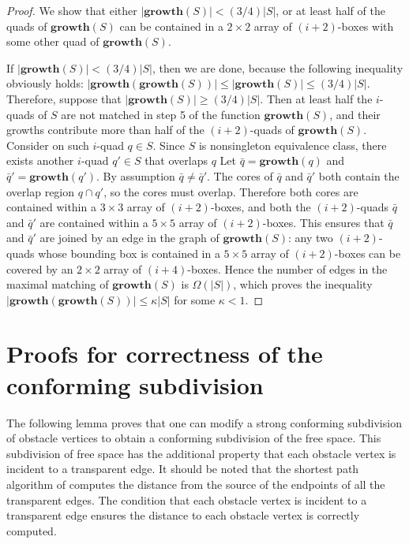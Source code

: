 \begin{proof}
We show that either $|\mathbf{growth}(S)| < (3/4)|S|$, or at least half of the quads of $\mathbf{growth}(S)$ can be contained in a $2 \times 2$ array of $(i+2)$-boxes with some other quad of $\mathbf{growth}(S)$. 

If $|\mathbf{growth}(S)| < (3/4)|S|$, then we are done, because the following inequality obviously holds: $|\mathbf{growth}(\mathbf{growth}(S))| \leq |\mathbf{growth}(S)| \leq (3/4)|S|$. Therefore, suppose that $|\mathbf{growth}(S)| \geq (3/4)|S|$. Then at least half the $i$-quads of $S$ are not matched in step 5 of the function $\mathbf{growth}(S)$, and their growths contribute more than half of the $(i+2)$-quads of $\mathbf{growth}(S)$. Consider on such $i$-quad $q\in S$. Since $S$ is nonsingleton equivalence class, there exists another $i$-quad $q'\in S$ that overlaps $q$ Let $\bar{q}=\mathbf{growth}(q)$ and $\bar{q}' = \mathbf{growth}(q')$. By assumption $\bar{q} \neq \bar{q}'$. The cores of $\bar{q}$ and $\bar{q}'$ both contain the overlap region $q\cap q'$, so the cores must overlap. Therefore both cores are contained within a $3 \times 3$ array of $(i+2)$-boxes, and both the $(i+2)$-quads $\bar{q}$ and $\bar{q}'$ are contained within a $5 \times 5$ array of $(i+2)$-boxes. This ensures that $\bar{q}$ and $\bar{q}'$ are joined by an edge in the graph of $\mathbf{growth}(S)$: any two $(i+2)$-quads whose bounding box is contained in a $5 \times 5$ array of $(i+2)$-boxes can be covered by an $2 \times 2$ array of $(i+4)$-boxes. Hence the number of edges in the maximal matching of $\mathbf{growth}(S)$ is $\Omega(|S|)$, which proves the inequality $|\mathbf{growth}(\mathbf{growth}(S))| \leq \kappa|S|$ for some $\kappa < 1$.
\end{proof}

\section{Proofs for correctness of the conforming subdivision}

The following lemma proves that one can modify a strong conforming subdivision of 
obstacle vertices to obtain a conforming subdivision of the free space. This 
subdivision of free space has the additional property that each obstacle vertex is 
incident to a transparent edge. It should be noted that the shortest path algorithm of 
\cite{HershbergerS99} computes the distance from the source of the endpoints of all 
the transparent edges. The condition that each obstacle vertex is incident to a 
transparent edge ensures the distance to each obstacle vertex is correctly computed.

